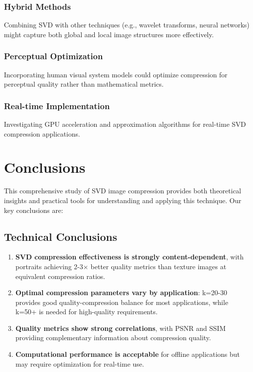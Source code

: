 \documentclass[12pt,a4paper]{article}
\begin{document}
\subsubsection{Hybrid Methods}

Combining SVD with other techniques (e.g., wavelet transforms, neural networks) might capture both global and local image structures more effectively.

\subsubsection{Perceptual Optimization}

Incorporating human visual system models could optimize compression for perceptual quality rather than mathematical metrics.

\subsubsection{Real-time Implementation}

Investigating GPU acceleration and approximation algorithms for real-time SVD compression applications.

\section{Conclusions}

This comprehensive study of SVD image compression provides both theoretical insights and practical tools for understanding and applying this technique. Our key conclusions are:

\subsection{Technical Conclusions}

\begin{enumerate}
    \item \textbf{SVD compression effectiveness is strongly content-dependent}, with portraits achieving 2-3× better quality metrics than texture images at equivalent compression ratios.
    
    \item \textbf{Optimal compression parameters vary by application}: k=20-30 provides good quality-compression balance for most applications, while k=50+ is needed for high-quality requirements.
    
    \item \textbf{Quality metrics show strong correlations}, with PSNR and SSIM providing complementary information about compression quality.
    
    \item \textbf{Computational performance is acceptable} for offline applications but may require optimization for real-time use.
\end{enumerate}
\end{document}
